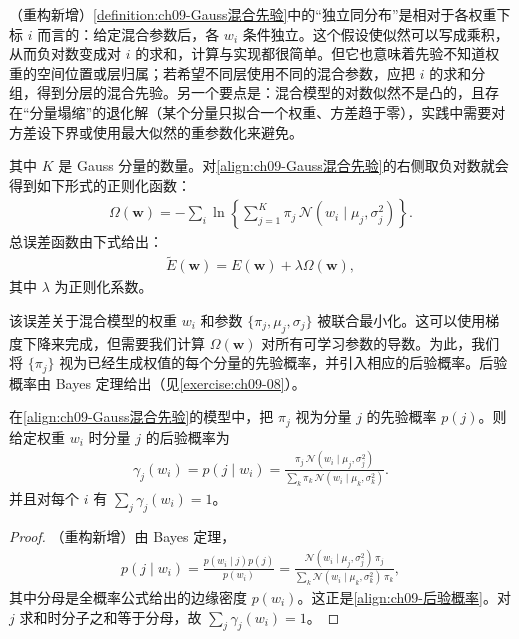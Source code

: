 \documentclass[../../main.tex]{subfiles}
\begin{document}
\begin{remark}（重构新增）\cref{definition:ch09-Gauss混合先验}中的“独立同分布”是相对于各权重下标 $i$ 而言的：给定混合参数后，各 $w_{i}$ 条件独立。这个假设使似然可以写成乘积，从而负对数变成对 $i$ 的求和，计算与实现都很简单。但它也意味着先验不知道权重的空间位置或层归属；若希望不同层使用不同的混合参数，应把 $i$ 的求和分组，得到分层的混合先验。另一个要点是：混合模型的对数似然不是凸的，且存在“分量塌缩”的退化解（某个分量只拟合一个权重、方差趋于零），实践中需要对方差设下界或使用最大似然的重参数化来避免。
\end{remark}

其中 $K$ 是 Gauss 分量的数量。对\eqref{align:ch09-Gauss混合先验}的右侧取负对数就会得到如下形式的正则化函数：
\begin{align}
\Omega(\boldsymbol{w})=-\sum_{i}\ln\left\{\sum_{j=1}^{K}\pi_{j}\,\mathcal{N}\!\left(w_{i}\mid\mu_{j},\sigma_{j}^{2}\right)\right\}.
\label{align:ch09-软共享正则}
\end{align}
总误差函数由下式给出：
\begin{align}
\widetilde{E}(\boldsymbol{w})=E(\boldsymbol{w})+\lambda\Omega(\boldsymbol{w}),
\label{align:ch09-软共享总误差}
\end{align}
其中 $\lambda$ 为正则化系数。

该误差关于混合模型的权重 $w_{i}$ 和参数 $\{\pi_{j},\mu_{j},\sigma_{j}\}$ 被联合最小化。这可以使用梯度下降来完成，但需要我们计算 $\Omega(\boldsymbol{w})$ 对所有可学习参数的导数。为此，我们将 $\{\pi_{j}\}$ 视为已经生成权值的每个分量的先验概率，并引入相应的后验概率。后验概率由 Bayes 定理给出（见\cref{exercise:ch09-08}）。

\begin{proposition}[软权重共享的后验概率]\label{proposition:ch09-软共享后验}
在\eqref{align:ch09-Gauss混合先验}的模型中，把 $\pi_{j}$ 视为分量 $j$ 的先验概率 $p(j)$。则给定权重 $w_{i}$ 时分量 $j$ 的后验概率为
\begin{align}
\gamma_{j}(w_{i})=p(j\mid w_{i})=\frac{\pi_{j}\,\mathcal{N}\!\left(w_{i}\mid\mu_{j},\sigma_{j}^{2}\right)}{\sum_{k}\pi_{k}\,\mathcal{N}\!\left(w_{i}\mid\mu_{k},\sigma_{k}^{2}\right)}.
\label{align:ch09-后验概率}
\end{align}
并且对每个 $i$ 有 $\sum_{j}\gamma_{j}(w_{i})=1$。
\end{proposition}

\begin{proof}
（重构新增）由 Bayes 定理，
\begin{align*}
p(j\mid w_{i})=\frac{p(w_{i}\mid j)p(j)}{p(w_{i})}=\frac{\mathcal{N}(w_{i}\mid\mu_{j},\sigma_{j}^{2})\,\pi_{j}}{\sum_{k}\mathcal{N}(w_{i}\mid\mu_{k},\sigma_{k}^{2})\,\pi_{k}},
\end{align*}
其中分母是全概率公式给出的边缘密度 $p(w_{i})$。这正是\eqref{align:ch09-后验概率}。对 $j$ 求和时分子之和等于分母，故 $\sum_{j}\gamma_{j}(w_{i})=1$。
\end{proof}
\end{document}
